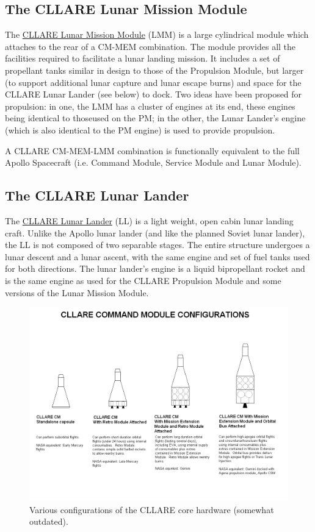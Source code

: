 \documentclass{report}
\begin{document}
\subsection{The CLLARE Lunar Mission Module}

The \href{http://cstart.org/wiki/CLLARE_Lunar_Mission_Module}{CLLARE Lunar Mission Module} (LMM) is a large cylindrical module which attaches to the rear of a CM-MEM combination.  The module provides all the facilities required to facilitate a lunar landing mission.  It includes a set of propellant tanks similar in design to those of the Propulsion Module, but larger (to support additional lunar capture and lunar escape burns) and space for the CLLARE Lunar Lander (see below) to dock.  Two ideas have been proposed for propulsion: in one, the LMM has a cluster of engines at its end, these engines being identical to thoseused on the PM; in the other, the Lunar Lander's engine (which is also identical to the PM engine) is used to provide propulsion.

A CLLARE CM-MEM-LMM combination is functionally equivalent to the full Apollo Spacecraft (i.e. Command Module, Service Module and Lunar Module).

\subsection{The CLLARE Lunar Lander}

The \href{http://cstart.org/wiki/CLLARE_Lunar_Lander}{CLLARE Lunar Lander} (LL) is a light weight, open cabin lunar landing craft.  Unlike the Apollo lunar lander (and like the planned Soviet lunar lander), the LL is not composed of two separable stages.  The entire structure undergoes a lunar descent and a lunar ascent, with the same engine and set of fuel tanks used for both directions.  The lunar lander's engine is a liquid bipropellant rocket and is the same engine as used for the CLLARE Propulsion Module and some versions of the Lunar Mission Module.

\begin{figure}[h] \label{fig:cm_configs}
\includegraphics[angle=270, scale=0.6]{images/cllare_cm_configs}
\caption{Various configurations of the CLLARE core hardware (somewhat outdated).}
\end{figure}
\end{document}
